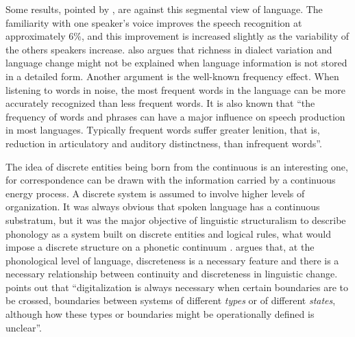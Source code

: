 Some results, pointed by \cite{port2007}, are against this segmental view of language. 
The familiarity with one speaker's voice improves the speech recognition at approximately 6\%, 
and this improvement is increased slightly as the variability of the others speakers increase. 
\cite{port2007} also argues that richness in dialect variation and language change might not be explained 
when language information is not stored in a detailed form. Another argument is the well-known frequency effect. 
When listening to words in noise, the most frequent words in the language can be more accurately recognized 
than less frequent words. It is also known that ``the frequency of words and phrases can have a major influence 
on speech production in most languages. Typically frequent words suffer greater lenition, that is, 
reduction in articulatory and auditory distinctness, than infrequent words''\citep{port2007}. 

The idea of discrete entities being born from the continuous is an interesting one,
for correspondence can be drawn with the information carried by a continuous energy process.
A discrete system is assumed to involve higher levels of organization.
It was always obvious that spoken language has a continuous substratum, but
it was the major objective of linguistic structuralism to describe phonology
as a system built on discrete entities and logical rules, what would impose
a discrete structure on a phonetic continuum \citep{chomsky1957}. 
\cite{mandelbrot1954} argues that, at the phonological level of language, discreteness is a necessary feature
and there is a necessary relationship between continuity and discreteness in linguistic change.
\cite{wilden2001} points out that ``digitalization is always necessary when certain boundaries are to be crossed,
boundaries between systems of different \textit{types} or of different \textit{states},
although how these types or boundaries might be operationally defined is unclear''. 



